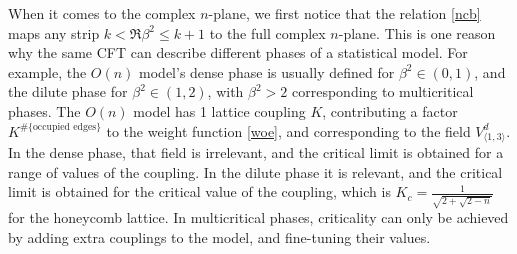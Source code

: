 \documentclass[12pt, a4paper]{article}
\begin{document}
When it comes to the complex $n$-plane, we first notice that the relation \eqref{ncb} maps any strip $k<\Re \beta^2\leq k+1$ to the full complex $n$-plane. 
This is one reason why the same CFT can describe different phases of a statistical model. For example, the $O(n)$ model's dense phase is usually defined for $\beta^2\in (0,1)$, and the dilute phase for $\beta^2\in (1,2)$, with $\beta^2>2$ corresponding to multicritical phases. The $O(n)$ model has 1 lattice coupling $K$, contributing a factor $K^{\#\{\text{occupied edges}\}}$ to the weight function \eqref{woe}, and corresponding to the field $V^d_{\langle 1,3\rangle}$. In the dense phase, that field is irrelevant, and the critical limit is obtained for a range of values of the coupling. In the dilute phase it is relevant, and the critical limit is obtained for the critical value of the coupling, which is $K_c = \frac{1}{\sqrt{2+\sqrt{2-n}}}$ for the honeycomb lattice. In multicritical phases, criticality can only be achieved by adding extra couplings to the model, and fine-tuning their values. 
\end{document}
